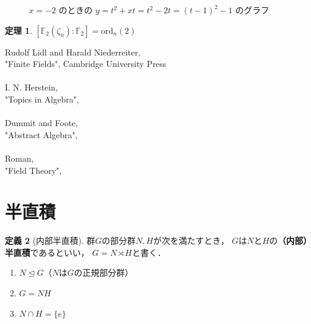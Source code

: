 \documentclass[dvipdfmx,a4paper,12pt]{jsarticle}
\theoremstyle{definition}
\newtheorem{theorem}{定理}[section]
\newtheorem{definition}[theorem]{定義}
\begin{document}
\begin{figure}[htbp]
    \centering
    \caption{$x=-2$ のときの $y=t^2+xt=t^2-2t=(t-1)^2-1$ のグラフ}
\end{figure}


\newpage

\begin{theorem}
    $[\mathbb{F}_2(\zeta_n):\mathbb{F}_2]=\mathrm{ord}_n(2)$
\end{theorem}
Rudolf Lidl and Harald Niederreiter,\\
"Finite Fields", Cambridge University Press\\
\\
I. N. Herstein,\\
"Topics in Algebra",\\
\\
Dummit and Foote,\\
"Abstract Algebra",\\
\\
Roman,\\
"Field Theory",\\



\section{半直積}

\begin{definition}[内部半直積]
    群$G$の部分群$N,H$が次を満たすとき，
    $G$は$N$と$H$の\textbf{（内部）半直積}であるといい，
    $G=N\rtimes H$と書く．
    \begin{enumerate}
        \item $N\trianglelefteq G$（$N$は$G$の正規部分群）
        \item $G=NH$
        \item $N\cap H=\{e\}$
    \end{enumerate}
\end{definition}
\end{document}
